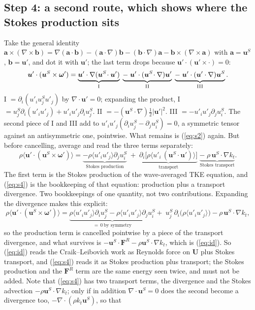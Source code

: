 \documentclass[10pt]{article}
\newcommand{\av}[1]{\langle #1\rangle}\newcommand{\uS}{\bm u^S}\newcommand{\WS}{\mathcal W_S}\newcommand{\PS}{\mathcal P_S}
\newcommand{\bu}{\bm u}\newcommand{\bU}{\bm U}\newcommand{\bxi}{\bm\xi}\newcommand{\dd}{\mathrm d}
\begin{document}
\subsection{Step 4: a second route, which shows where the Stokes production sits}
Take the general identity $\bm a\times(\nabla\times\bm b)=\nabla(\bm a\cdot\bm b)-(\bm a\cdot\nabla)\bm b-(\bm b\cdot\nabla)\bm a-\bm b\times(\nabla\times\bm a)$ with $\bm a=\uS$, $\bm b=\bu'$, and dot it with $\bu'$; the last term drops because $\bu'\cdot(\bu'\times\cdot)=0$:
\[
\bu'\cdot(\uS\times\bm\omega')=\underbrace{\bu'\cdot\nabla(\uS\!\cdot\bu')}_{\rm I}\;\underbrace{-\;\bu'\cdot(\uS\!\cdot\nabla)\bu'}_{\rm II}\;\underbrace{-\;\bu'\cdot(\bu'\cdot\nabla)\uS}_{\rm III}.
\]
I $=\partial_i(u'_iu^S_ju'_j)$ by $\nabla\cdot\bu'=0$; expanding the product, I $=u^S_j\partial_i(u'_iu'_j)+u'_iu'_j\partial_iu^S_j$. II $=-(\uS\cdot\nabla)\tfrac12|\bu'|^2$. III $=-u'_iu'_j\partial_ju^S_i$. The second piece of I and III add to $u'_iu'_j(\partial_iu^S_j-\partial_ju^S_i)=0$, a symmetric tensor against an antisymmetric one, pointwise. What remains is (\ref{eq:s2}) again. But before cancelling, average and read the three terms separately:
\begin{equation}
\rho\av{\bu'\cdot(\uS\times\bm\omega')}=\underbrace{-\rho\av{u'_iu'_j}\partial_ju^S_i}_{\text{Stokes production}}\;+\;\underbrace{\partial_i\big[\rho\av{u'_i\,(\uS\!\cdot\bu')}\big]}_{\text{transport}}\;\underbrace{-\;\rho\,\uS\!\cdot\nabla k_t}_{\text{Stokes transport}} .
\label{eq:s4}
\end{equation}
The first term is the Stokes production of the wave-averaged TKE equation, and (\ref{eq:s4}) is the bookkeeping of that equation: production plus a transport divergence. Two bookkeepings of one quantity, not two contributions. Expanding the divergence makes this explicit:
\[
\rho\av{\bu'\cdot(\uS\times\bm\omega')}=\underbrace{\rho\av{u'_iu'_j}\partial_iu^S_j-\rho\av{u'_iu'_j}\partial_ju^S_i}_{=\,0\ \text{by symmetry}}+\;u^S_j\,\partial_i\big(\rho\av{u'_iu'_j}\big)-\rho\,\uS\!\cdot\nabla k_t ,
\]
so the production term is cancelled pointwise by a piece of the transport divergence, and what survives is $-\uS\!\cdot\bm F^R-\rho\uS\!\cdot\nabla k_t$, which is (\ref{eq:id}). So (\ref{eq:id}) reads the Craik--Leibovich work as Reynolds force on $\bU$ plus Stokes transport, and (\ref{eq:s4}) reads it as Stokes production plus transport; the Stokes production and the $\bm F^R$ term are the same energy seen twice, and must not be added. Note that (\ref{eq:s4}) has two transport terms, the divergence and the Stokes advection $-\rho\uS\!\cdot\nabla k_t$; only if in addition $\nabla\cdot\uS=0$ does the second become a divergence too, $-\nabla\cdot(\rho k_t\uS)$, so that
\end{document}
